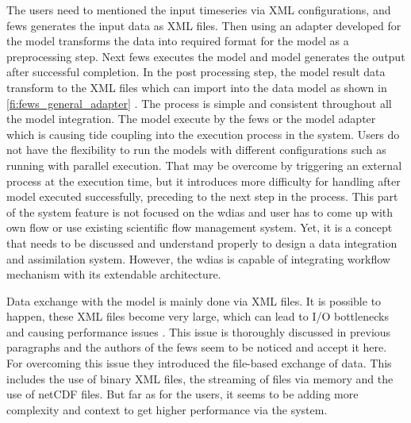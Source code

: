 The users need to mentioned the input timeseries via XML configurations, and \acrshort{fews} generates the input data as XML files. Then using an adapter developed for the model transforms the data into required format for the model as a preprocessing step. Next \acrshort{fews} executes the model and model generates the output after successful completion. In the post processing step, the model result data transform to the XML files which can import into the data model as shown in \cref{fi:fews_general_adapter} \cite{Werner2013TheSystem}. The process is simple and consistent throughout all the model integration. The model execute by the \acrshort{fews} or the model adapter which is causing tide coupling into the execution process in the system. Users do not have the flexibility to run the models with different configurations such as running with parallel execution. That may be overcome by triggering an external process at the execution time, but it introduces more difficulty for handling after model executed successfully, preceding to the next step in the process. This part of the system feature is not focused on the \acrshort{wdias} and user has to come up with own flow or use existing scientific flow management system. Yet, it is a concept that needs to be discussed and understand properly to design a data integration and assimilation system. However, the \acrshort{wdias} is capable of integrating workflow mechanism with its extendable architecture.

Data exchange with the model is mainly done via XML files. It is possible to happen, these XML files become very large, which can lead to I/O bottlenecks and causing performance issues \cite{Werner2013TheSystem}. This issue is thoroughly discussed in previous paragraphs and the authors of the \acrshort{fews} \cite{Werner2013TheSystem} seem to be noticed and accept it here. For overcoming this issue they introduced the file-based exchange of data. This includes the use of binary XML files, the streaming of files via memory and the use of \acrshort{netCDF} files. But far as for the users, it seems to be adding more complexity and context to get higher performance via the system.

